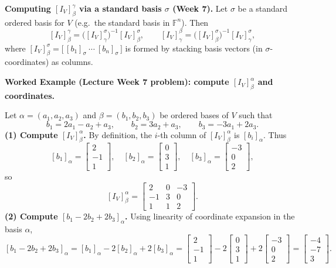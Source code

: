 \begin{keyformula}
\textbf{Computing $[I_V]^{\gamma}_{\beta}$ via a standard basis $\sigma$ (Week 7).}
Let $\sigma$ be a standard ordered basis for $V$ (e.g.\ the standard basis in $\mathbb{F}^n$).
Then
\[
[I_V]^{\gamma}_{\beta} = \bigl([I_V]^{\sigma}_{\gamma}\bigr)^{-1}[I_V]^{\sigma}_{\beta},
\qquad
[I_V]^{\beta}_{\gamma} = \bigl([I_V]^{\sigma}_{\beta}\bigr)^{-1}[I_V]^{\sigma}_{\gamma},
\]
where $[I_V]^{\sigma}_{\beta}=\bigl[\, [b_1]_\sigma\ \cdots\ [b_n]_\sigma\,\bigr]$ is formed by stacking basis vectors (in $\sigma$-coordinates) as columns.
\end{keyformula}

\begin{examplebox}
\textbf{Worked Example (Lecture Week 7 problem): compute $[I_V]^{\alpha}_{\beta}$ and coordinates.}

Let $\alpha=(a_1,a_2,a_3)$ and $\beta=(b_1,b_2,b_3)$ be ordered bases of $V$ such that
\[
b_1=2a_1-a_2+a_3,\qquad b_2=3a_2+a_3,\qquad b_3=-3a_1+2a_3.
\]
\textbf{(1) Compute $[I_V]^{\alpha}_{\beta}$.}
By definition, the $i$-th column of $[I_V]^{\alpha}_{\beta}$ is $[b_i]_\alpha$.
Thus
\[
[b_1]_\alpha=\begin{bmatrix}2\\-1\\1\end{bmatrix},\quad
[b_2]_\alpha=\begin{bmatrix}0\\3\\1\end{bmatrix},\quad
[b_3]_\alpha=\begin{bmatrix}-3\\0\\2\end{bmatrix},
\]
so
\[
[I_V]^{\alpha}_{\beta}=
\begin{bmatrix}
2 & 0 & -3\\
-1 & 3 & 0\\
1 & 1 & 2
\end{bmatrix}.
\]
\textbf{(2) Compute $[b_1-2b_2+2b_3]_\alpha$.}
Using linearity of coordinate expansion in the basis $\alpha$,
\[
[b_1-2b_2+2b_3]_\alpha=[b_1]_\alpha-2[b_2]_\alpha+2[b_3]_\alpha
=
\begin{bmatrix}2\\-1\\1\end{bmatrix}
-2\begin{bmatrix}0\\3\\1\end{bmatrix}
+2\begin{bmatrix}-3\\0\\2\end{bmatrix}
=
\begin{bmatrix}-4\\-7\\3\end{bmatrix}.
\]
\end{examplebox}

